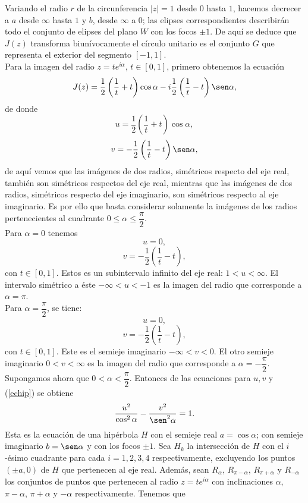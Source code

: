 Variando el radio $r$ de la circunferencia $|z|=1$ desde $0$ hasta $1$, hacemos decrecer a $a$ desde $\infty$ hasta $1$ y $b$, desde $\infty$ a $0$; las elipses correspondientes describirán todo el conjunto de elipses del plano $W$ con los focos $\pm 1$. De aquí se deduce que $J(z)$ transforma biunívocamente  el círculo unitario es el conjunto $G$ que representa el exterior del segmento $[-1,1]$.\\
Para la imagen del radio $z=te^{i\alpha}$, $t\in[0,1]$, primero obtenemos la ecuación 
\begin{equation}\label{echip}
	J(z)=\dfrac{1}{2}\left(\dfrac{1}{t}+t\right)\cos \alpha-i\dfrac{1}{2}\left(\dfrac{1}{t}-t\right)\sen \alpha,
\end{equation}
de donde 
$$u=\dfrac{1}{2}\left(\dfrac{1}{t}+t\right)\cos \alpha,$$
$$v=-\dfrac{1}{2}\left(\dfrac{1}{t}-t\right)\sen \alpha,$$
de aquí vemos que las imágenes de dos radios, simétricos respecto del eje real, también son simétricos respectos del eje real, mientras que las imágenes de dos radios, simétricos respecto del eje imaginario, son simétricos respecto al eje imaginario. Es por ello que basta considerar solamente la imágenes de los radios pertenecientes al cuadrante $0\leq \alpha\leq \dfrac{\pi}{2}$.\\
Para $\alpha=0$ tenemos 
$$u=0,$$
$$v=-\dfrac{1}{2}\left(\dfrac{1}{t}-t\right),$$
con $t\in[0,1]$. Estos es un subintervalo infinito del eje real: $1<u<\infty$. El intervalo simétrico a éste $-\infty<u<-1$ es la imagen del radio que corresponde a $\alpha=\pi$.\\
Para $\alpha=\dfrac{\pi}{2}$, se tiene: 
$$u=0,$$
$$v=-\dfrac{1}{2}\left(\dfrac{1}{t}-t\right),$$
con $t\in[0,1]$. Este es el semieje imaginario $-\infty<v<0$. El otro semieje imaginario $0<v<\infty$ es la imagen del radio que corresponde a $\alpha=-\dfrac{\pi}{2}$.\\
Supongamos ahora que $0<\alpha<\dfrac{\pi}{2}$. Entonces de las ecuaciones para $u,v$ y (\ref{echip}) se obtiene
\begin{equation}\label{elipse}
	\dfrac{u^2}{\cos^{2}\alpha}-\dfrac{v^2}{\sen^{2}\alpha}=1.
\end{equation}
Esta es la ecuación de una hipérbola $H$ con el semieje real $a=\cos \alpha$; con semieje imaginario $b=\sen \alpha$ y con los focos $\pm 1$. Sea $H_k$ la intersección de $H$ con el $i$-ésimo cuadrante para cada $i=1,2,3,4$ respectivamente, excluyendo los puntos $(\pm a,0)$ de $H$ que pertenecen al eje real. Además, sean $R_{\alpha}$, $R_{\pi-\alpha}$, $R_{\pi+\alpha}$ y $R_{-\alpha}$ los conjuntos de puntos que pertenecen al radio $z=te^{i\alpha}$ con inclinaciones $\alpha$, $\pi-\alpha$, $\pi +\alpha$ y $-\alpha$ respectivamente. Tenemos que 
